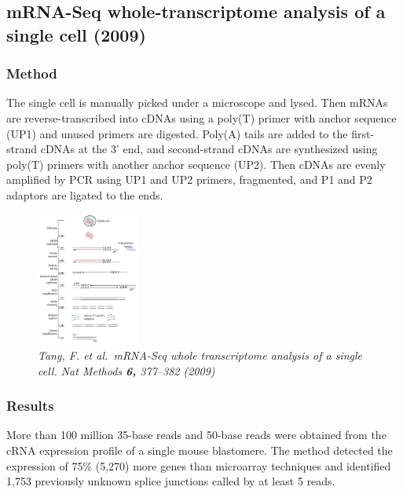 \hypertarget{mrna-seq-whole-transcriptome-analysis-of-a-single-cell-2009}{%
\subsection{mRNA-Seq whole-transcriptome analysis of a single cell
(2009)}\label{mrna-seq-whole-transcriptome-analysis-of-a-single-cell-2009}}

\hypertarget{method}{%
\subsubsection{Method}\label{method}}

The single cell is manually picked under a microscope and lysed. Then
mRNAs are reverse-transcribed into cDNAs using a poly(T) primer with
anchor sequence (UP1) and unused primers are digested. Poly(A) tails are
added to the first-strand cDNAs at the 3' end, and second-strand cDNAs
are synthesized using poly(T) primers with another anchor sequence
(UP2). Then cDNAs are evenly amplified by PCR using UP1 and UP2 primers,
fragmented, and P1 and P2 adaptors are ligated to the ends.

\begin{figure}
\centering
\includegraphics[width=0.3\textwidth]{images/Screen_Shot_2023-02-20_at_19-18-51.png}
\caption{\emph{Tang, F. et al.~mRNA-Seq whole transcriptome analysis of
a single cell. Nat Methods \textbf{6,} 377--382 (2009)}}
\end{figure}

\hypertarget{results}{%
\subsubsection{\texorpdfstring{\textbf{Results}}{Results}}\label{results}}

More than 100 million 35-base reads and 50-base reads were obtained from
the cRNA expression profile of a single mouse blastomere. The method
detected the expression of 75\% (5,270) more genes than microarray
techniques and identified 1,753 previously unknown splice junctions
called by at least 5 reads.

